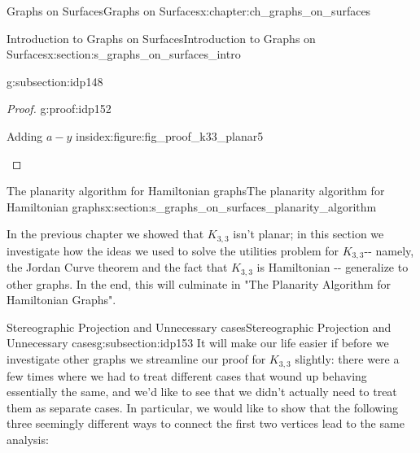 \documentclass[oneside,10pt,]{book}
\numberwithin{equation}{section}
\begin{document}
\begin{chapterptx}{Graphs on Surfaces}{}{Graphs on Surfaces}{}{}{x:chapter:ch_graphs_on_surfaces}
\begin{sectionptx}{Introduction to Graphs on Surfaces}{}{Introduction to Graphs on Surfaces}{}{}{x:section:s_graphs_on_surfaces_intro}
\begin{subsectionptx}{}{}{}{}{}{g:subsection:idp148}
\begin{proof}{}{g:proof:idp152}
\begin{figureptx}{Adding \(a-y\) inside}{x:figure:fig_proof_k33_planar5}{}
\begin{image}{0.15}{0.7}{0.15}
{
}%
\end{image}%
\tcblower
\end{figureptx}%
\end{proof}
\end{subsectionptx}
\end{sectionptx}
%
%
\typeout{************************************************}
\typeout{************************************************}
%
\begin{sectionptx}{The planarity algorithm for Hamiltonian graphs}{}{The planarity algorithm for Hamiltonian graphs}{}{}{x:section:s_graphs_on_surfaces_planarity_algorithm}
\begin{introduction}{}%
In the previous chapter we showed that \(K_{3,3}\) isn't planar; in this section we investigate how the ideas we used to solve the utilities problem for \(K_{3,3}\)-{}-{} namely, the Jordan Curve theorem and the fact that \(K_{3,3}\) is Hamiltonian -{}-{} generalize to other graphs.  In the end, this will culminate in "The Planarity Algorithm for Hamiltonian Graphs".%
\end{introduction}%
%
%
\typeout{************************************************}
\typeout{************************************************}
%
\begin{subsectionptx}{Stereographic Projection and Unnecessary cases}{}{Stereographic Projection and Unnecessary cases}{}{}{g:subsection:idp153}
It will make our life easier if before we investigate other graphs we streamline our proof for \(K_{3,3}\) slightly: there were a few times where we had to treat different cases that wound up behaving essentially the same, and we'd like to see that we didn't actually need to treat them as separate cases.  In particular, we would like to show that the following three seemingly different ways to connect the first two vertices lead to the same analysis:%

\end{subsectionptx}
\end{sectionptx}
\end{chapterptx}
\end{document}

